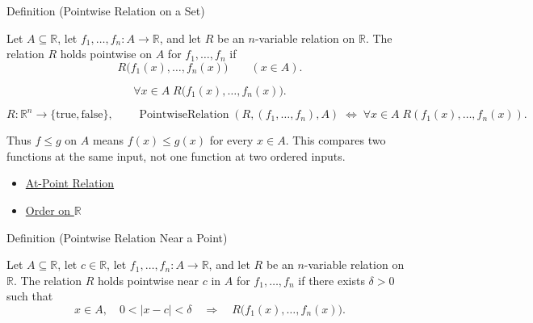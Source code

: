 \begin{definitionbox}{Definition (Pointwise Relation on a Set)}
\begin{definition}
\label{def:pointwise-relation-on-set}
Let \(A\subseteq\mathbb{R}\), let \(f_1,\ldots,f_n:A\to\mathbb{R}\),
and let \(R\) be an \(n\)-variable relation on \(\mathbb{R}\).  The
relation \(R\) holds pointwise on \(A\) for \(f_1,\ldots,f_n\) if
\[
  R\bigl(f_1(x),\ldots,f_n(x)\bigr)
  \qquad (x\in A).
\]
\end{definition}
\end{definitionbox}

\begin{remark*}
\[
  \forall x\in A\;
  R\bigl(f_1(x),\ldots,f_n(x)\bigr).
\]
\end{remark*}

\begin{remark*}
\[
  R\colon \mathbb{R}^n\to\{\mathrm{true},\mathrm{false}\},\qquad
  \operatorname{PointwiseRelation}(R,(f_1,\ldots,f_n),A)
  \;\Longleftrightarrow\;
  \forall x\in A\;R(f_1(x),\ldots,f_n(x)).
\]
\end{remark*}

\begin{remark*}[Interpretation]
Thus \(f\leq g\) on \(A\) means \(f(x)\leq g(x)\) for every \(x\in A\).
This compares two functions at the same input, not one function at two ordered
inputs.
\end{remark*}

\begin{dependencies}
\begin{itemize}
  \item \hyperref[def:at-point-relation]{At-Point Relation}
  \item \hyperref[def:order-on-r]{Order on \(\mathbb{R}\)}
\end{itemize}
\end{dependencies}

\begin{definitionbox}{Definition (Pointwise Relation Near a Point)}
\begin{definition}
\label{def:pointwise-relation-near-point}
Let \(A\subseteq\mathbb{R}\), let \(c\in\mathbb{R}\), let
\(f_1,\ldots,f_n:A\to\mathbb{R}\), and let \(R\) be an \(n\)-variable
relation on \(\mathbb{R}\).  The relation \(R\) holds pointwise near \(c\)
in \(A\) for \(f_1,\ldots,f_n\) if there exists \(\delta>0\) such that
\[
  x\in A,\quad 0<|x-c|<\delta
  \quad\Longrightarrow\quad
  R\bigl(f_1(x),\ldots,f_n(x)\bigr).
\]
\end{definition}
\end{definitionbox}


